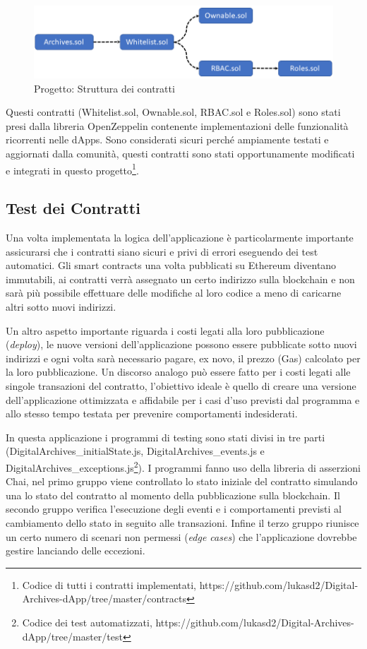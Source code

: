 \begin{figure}[H]
\centering
\includegraphics[width=1\textwidth]{immagini/contractStructure.png}
\caption{Progetto: Struttura dei contratti}
\label{fig:contractStructure}
\end{figure}

Questi contratti (Whitelist.sol, Ownable.sol, RBAC.sol e Roles.sol) sono stati presi dalla libreria OpenZeppelin contenente implementazioni delle funzionalità ricorrenti nelle dApps. Sono considerati sicuri perché ampiamente testati e aggiornati dalla comunità, questi contratti sono stati opportunamente modificati e integrati in questo progetto{\footnote{Codice di tutti i contratti implementati, https://github.com/lukasd2/Digital-Archives-dApp/tree/master/contracts}}.

\subsection{Test dei Contratti}

Una volta implementata la logica dell'applicazione è particolarmente importante assicurarsi che i contratti siano sicuri e privi di errori eseguendo dei test automatici. Gli smart contracts una volta pubblicati su Ethereum diventano immutabili, ai contratti verrà assegnato un certo indirizzo sulla blockchain e non sarà più possibile effettuare delle modifiche al loro codice a meno di caricarne altri sotto nuovi indirizzi.

Un altro aspetto importante riguarda i costi legati alla loro pubblicazione (\emph{deploy}), le nuove versioni dell'applicazione possono essere pubblicate sotto nuovi indirizzi e ogni volta sarà necessario pagare, ex novo, il prezzo (Gas) calcolato per la loro pubblicazione. Un discorso analogo può essere fatto per i costi legati alle singole transazioni del contratto, l'obiettivo ideale è quello di creare una versione dell'applicazione ottimizzata e affidabile per i casi d'uso previsti dal programma e allo stesso tempo testata per prevenire comportamenti indesiderati.

In questa applicazione i programmi di testing sono stati divisi in tre parti (DigitalArchives\_initialState.js, DigitalArchives\_events.js e DigitalArchives\_exceptions.js{\footnote{Codice dei test automatizzati, https://github.com/lukasd2/Digital-Archives-dApp/tree/master/test}}). I programmi fanno uso della libreria di asserzioni Chai, nel primo gruppo viene controllato lo stato iniziale del contratto simulando una lo stato del contratto al momento della pubblicazione sulla blockchain. Il secondo gruppo verifica l'esecuzione degli eventi e i comportamenti previsti al cambiamento dello stato in seguito alle transazioni. Infine il terzo gruppo riunisce un certo numero di scenari non permessi (\emph{edge cases}) che l'applicazione dovrebbe gestire lanciando delle eccezioni.

